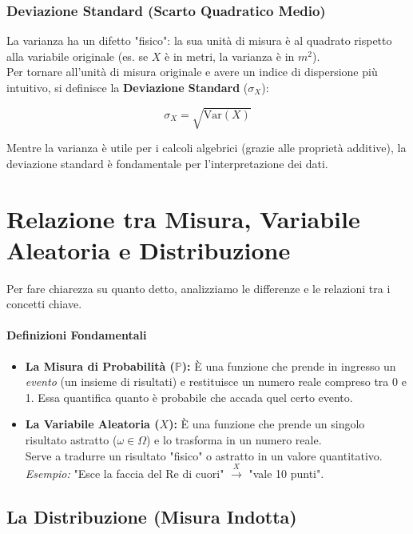 \subsubsection{Deviazione Standard (Scarto Quadratico Medio)}

La varianza ha un difetto "fisico": la sua unità di misura è al quadrato rispetto alla variabile originale (es. se $X$ è in metri, la varianza è in $m^2$).
\\Per tornare all'unità di misura originale e avere un indice di dispersione più intuitivo, si definisce la \textbf{Deviazione Standard} ($\sigma_X$):

\begin{equation}
\sigma_X = \sqrt{\text{Var}(X)}
\end{equation}

Mentre la varianza è utile per i calcoli algebrici (grazie alle proprietà additive), la deviazione standard è fondamentale per l'interpretazione dei dati.

\section{Relazione tra Misura, Variabile Aleatoria e Distribuzione}

Per fare chiarezza su quanto detto, analizziamo le differenze e le relazioni tra i concetti chiave.

\paragraph{Definizioni Fondamentali}
\begin{itemize}
    \item \textbf{La Misura di Probabilità ($\mathbb{P}$):} È una funzione che prende in ingresso un \textit{evento} (un insieme di risultati) e restituisce un numero reale compreso tra 0 e 1. Essa quantifica quanto è probabile che accada quel certo evento.
    
    \item \textbf{La Variabile Aleatoria ($X$):} È una funzione che prende un singolo risultato astratto ($\omega \in \Omega$) e lo trasforma in un numero reale.
    \\Serve a tradurre un risultato "fisico" o astratto in un valore quantitativo.
    \\\textit{Esempio:} "Esce la faccia del Re di cuori" $\xrightarrow{X}$ "vale 10 punti".
\end{itemize}

\subsection{La Distribuzione (Misura Indotta)}

